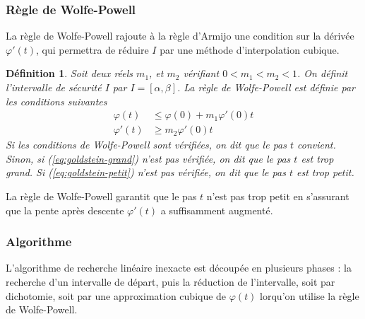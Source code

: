 \documentclass[3p, twocolumn]{elsarticle}
\newtheorem{definition}{Définition}[section]
\begin{document}
\subsubsection{Règle de Wolfe-Powell}
La règle de Wolfe-Powell rajoute à la règle d'Armijo une condition sur la dérivée $\varphi'(t)$, qui permettra de réduire $I$ par une méthode d'interpolation cubique.
\begin{definition}
    Soit deux réels $m_1$, et $m_2$ vérifiant $0<m_1<m_2<1$. On définit l'intervalle de sécurité $I$ par $I=[\alpha,\beta]$. La règle de Wolfe-Powell est définie par les conditions suivantes
    \begin{align}
        \varphi(t) &\leq \varphi(0) + m_1\varphi'(0)t
        \label{eq:wolfe-powell-grand}\\
        \varphi'(t) &\geq m_2\varphi'(0)t
        \label{eq:wolfe-powell-petit}
    \end{align}
    Si les conditions de Wolfe-Powell sont vérifiées, on dit que le pas $t$ convient. Sinon, si (\ref{eq:goldstein-grand}) n'est pas vérifiée, on dit que le pas $t$ est trop grand. Si (\ref{eq:goldstein-petit}) n'est pas vérifiée, on dit que le pas $t$ est trop petit.
\end{definition}
\begin{rmk}
    La règle de Wolfe-Powell garantit que le pas $t$ n'est pas trop petit en s'assurant que la pente après descente $\varphi'(t)$ a suffisamment augmenté. 
\end{rmk}
\subsubsection{Algorithme}
L'algorithme de recherche linéaire inexacte est découpée en plusieurs phases : la recherche d'un intervalle de départ, puis la réduction de l'intervalle, soit par dichotomie, soit par une approximation cubique de $\varphi(t)$ lorqu'on utilise la règle de Wolfe-Powell.
\end{document}
